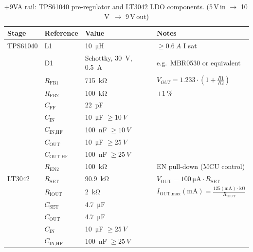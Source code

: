 \documentclass[11pt]{article}
\begin{document}
 \begin{table}[!htbp]
\centering
\caption{+9VA rail: TPS61040 pre-regulator and LT3042 LDO components. (5\,V\,in $\rightarrow$ 
10\,V\, $\rightarrow$ 9\,V\,out)}
\label{tab:9va-bom}
\begin{tabular}{l l l l}
\toprule
\textbf{Stage} & \textbf{Reference} & \textbf{Value} & \textbf{Notes} \\
\midrule
TPS61040 & L1                 & \SI{10}{\micro\henry}        & $\ge\SI{0.6}{A}$ I sat\\
         & D1                 & Schottky, \SI{30}{V}, \SI{0.5}{A} & e.g.\ MBR0530 or equivalent \\
         & $R_{\text{FB1}}$        & \SI{715}{\kilo\ohm}          & $V_{OUT} = 1.233 \cdot 
         \left(1+\frac{R1}{R2}\right)$ \\
         & $R_{\text{FB2}}$        & \SI{100}{\kilo\ohm}          & $\pm\SI{1}{\percent}$ \\
         & $C_{\text{FF}}$         & \SI{22}{\pico\farad}         & \\
         & $C_{\text{IN}}$   & \SI{10}{\micro\farad} $\ge\SI{10}{V}$ &  \\
         & $C_{\text{IN,HF}}$& \SI{100}{\nano\farad} $\ge\SI{10}{V}$ &  \\
         & $C_{\text{OUT}}$  & \SI{10}{\micro\farad} $\ge\SI{25}{V}$ &  \\
         & $C_{\text{OUT,HF}}$ & \SI{100}{\nano\farad} $\ge\SI{25}{V}$ &  \\
         & $R_{\text{EN2}}$        & \SI{100}{\kilo\ohm}          & EN pull-down (MCU control) \\
\midrule
LT3042   & $R_{\text{SET}}$        & \SI{90.9}{\kilo\ohm}         & $ V_{\text{OUT}} = \SI{100}{\micro\ampere} 
         \cdot R_{\text{SET}}$\\
         & $R_{\text{IOUT}}$       & \SI{2}{\kilo\ohm}            & $I_{\text{OUT,max}}(\si{\milli\ampere}) = 
         \frac{125 (\si{\milli\ampere}) \cdot \si{\kilo\ohm}}{R_{\text{IOUT}}}$ \\
         & $C_{\text{SET}}$        & \SI{4.7}{\micro\farad}       &  \\
         & $C_{\text{OUT}}$        & \SI{4.7}{\micro\farad}       &  \\
         & $C_{\text{IN}}$         & \SI{10}{\micro\farad} $\ge\SI{25}{V}$ &  \\
         & $C_{\text{IN,HF}}$      & \SI{100}{\nano\farad} $\ge\SI{25}{V}$ &  \\
\bottomrule
\end{tabular}
\end{table}
\end{document}
